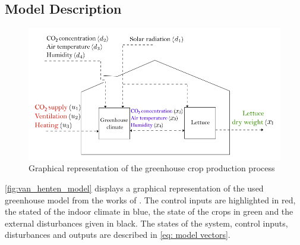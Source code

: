 \subsection{Model Description}
\begin{figure}[H]
	\centering
	\includegraphics[width = 0.75\linewidth]{figures/van_henten_model.png}
	\caption{Graphical representation of the greenhouse crop production process \cite{hentenGreenhouseClimateManagement1994}}
	\label{fig:van_henten_model}
\end{figure}

\autoref{fig:van_henten_model} displays a graphical representation of the used greenhouse model from the works of \cite{hentenGreenhouseClimateManagement1994}. The control inputs are highlighted in red, the stated of the indoor climate in blue, the state of the crops in green and the external disturbances given in black. The states of the system, control inputs, disturbances and outputs are described in \autoref{eq: model vectors}.

